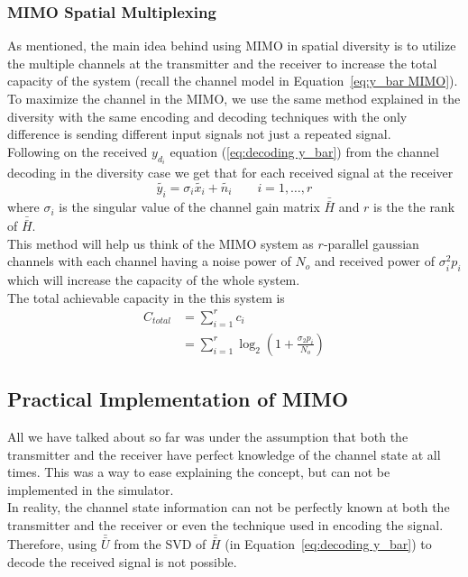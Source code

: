 \subsubsection{MIMO Spatial Multiplexing}
As mentioned, the main idea behind using MIMO in spatial diversity is to utilize the multiple channels at the transmitter and the receiver to increase the total capacity of the system (recall the channel model in Equation~\ref{eq:y_bar MIMO}). \\

To maximize the channel in the MIMO, we use the same method explained in the diversity with the same encoding and decoding techniques with the only difference is sending different input signals not just a repeated signal. \\
Following on the received $y_{d_i}$ equation (\ref{eq:decoding y_bar}) from the channel decoding in the diversity case we get that for each received signal at the receiver
\[ \tilde{y_i} = \sigma_i \tilde{x_i} + \tilde{n_i} \qquad i=1,\ldots,r \]
where $\sigma_i$ is the singular value of the channel gain matrix $\bar{\bar{H}}$ and $r$ is the the rank of $\bar{\bar{H}}$.\\
This method will help us think of the MIMO system as $r$-parallel gaussian channels with each channel having a noise power of $N_o$ and received power of $\sigma_i^2 p_i$ which will increase the capacity of the whole system. \\
The total achievable capacity in the this system is
\begin{equation}
    \label{eq:C sum in perfect knowledge}
    \begin{aligned}
        C_{total} &= \sum_{i=1}^{r} c_i \\
        &= \sum_{i=1}^{r} \log_2 \left( 1 + \frac{\sigma_2 p_i}{N_o} \right)
    \end{aligned}
\end{equation}

\subsection{Practical Implementation of MIMO}
All we have talked about so far was under the assumption that both the transmitter and the receiver have perfect knowledge of the channel state at all times. This was a way to ease explaining the concept, but can not be implemented in the simulator.\\

In reality, the channel state information can not be perfectly known at both the transmitter and the receiver or even the technique used in encoding the signal. Therefore, using $\bar{\bar{U}}$ from the SVD of $\bar{\bar{H}}$ (in Equation~\ref{eq:decoding y_bar}) to decode the received signal is not possible.\\

